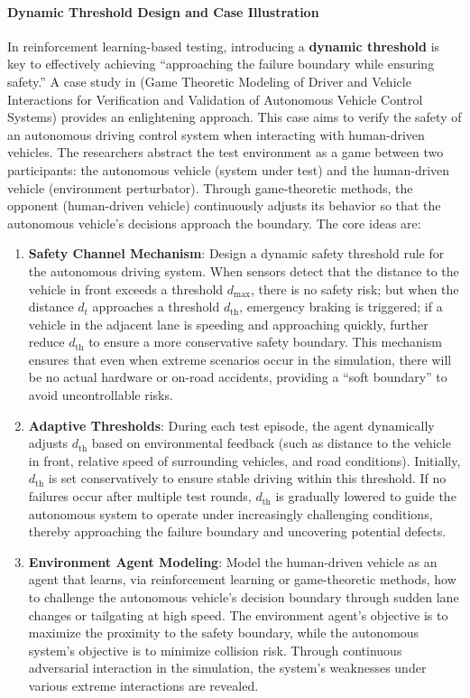 \documentclass[manuscript,screen,review]{acmart}
\begin{document}
\paragraph{Dynamic Threshold Design and Case Illustration}  
In reinforcement learning-based testing, introducing a \textbf{dynamic threshold} is key to effectively achieving ``approaching the failure boundary while ensuring safety.'' A case study in \cite{Li2018} (Game Theoretic Modeling of Driver and Vehicle Interactions for Verification and Validation of Autonomous Vehicle Control Systems) provides an enlightening approach. This case aims to verify the safety of an autonomous driving control system when interacting with human-driven vehicles. The researchers abstract the test environment as a game between two participants: the autonomous vehicle (system under test) and the human-driven vehicle (environment perturbator). Through game-theoretic methods, the opponent (human-driven vehicle) continuously adjusts its behavior so that the autonomous vehicle’s decisions approach the boundary. The core ideas are:

\begin{enumerate}
  \item \textbf{Safety Channel Mechanism}: Design a dynamic safety threshold rule for the autonomous driving system. When sensors detect that the distance to the vehicle in front exceeds a threshold $d_{\max}$, there is no safety risk; but when the distance $d_t$ approaches a threshold $d_{\mathrm{th}}$, emergency braking is triggered; if a vehicle in the adjacent lane is speeding and approaching quickly, further reduce $d_{\mathrm{th}}$ to ensure a more conservative safety boundary. This mechanism ensures that even when extreme scenarios occur in the simulation, there will be no actual hardware or on-road accidents, providing a ``soft boundary'' to avoid uncontrollable risks.
  \item \textbf{Adaptive Thresholds}: During each test episode, the agent dynamically adjusts $d_{\mathrm{th}}$ based on environmental feedback (such as distance to the vehicle in front, relative speed of surrounding vehicles, and road conditions). Initially, $d_{\mathrm{th}}$ is set conservatively to ensure stable driving within this threshold. If no failures occur after multiple test rounds, $d_{\mathrm{th}}$ is gradually lowered to guide the autonomous system to operate under increasingly challenging conditions, thereby approaching the failure boundary and uncovering potential defects.
  \item \textbf{Environment Agent Modeling}: Model the human-driven vehicle as an agent that learns, via reinforcement learning or game-theoretic methods, how to challenge the autonomous vehicle’s decision boundary through sudden lane changes or tailgating at high speed. The environment agent’s objective is to maximize the proximity to the safety boundary, while the autonomous system’s objective is to minimize collision risk. Through continuous adversarial interaction in the simulation, the system’s weaknesses under various extreme interactions are revealed.
\end{enumerate}
\end{document}

